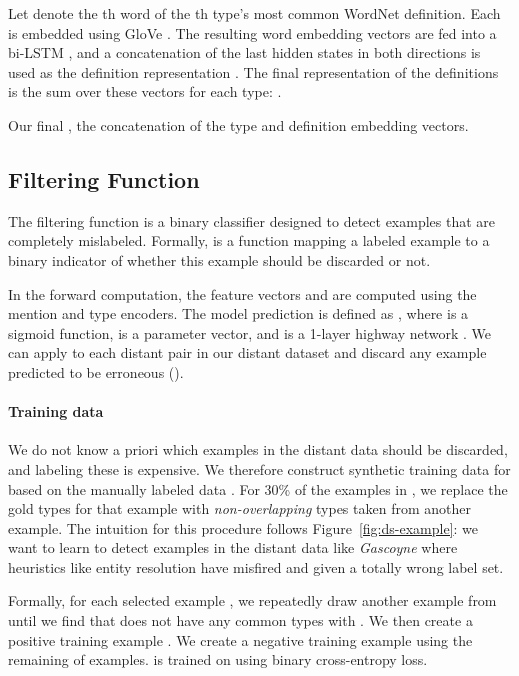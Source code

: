 \documentclass[11pt,a4paper]{article}
\begin{document}
Let  denote the th word of the th type's most common WordNet definition. Each  is embedded using GloVe \cite{glove_14}. The resulting word embedding vectors  are fed into a bi-LSTM \cite{lstm, bilstm}, and a concatenation of the last hidden states in both directions is used as the definition representation . The final representation of the definitions is the sum over these vectors for each type: .  

Our final , the concatenation of the type and definition embedding vectors.



\vspace{6pt}
 

\subsection{Filtering Function}\label{filter}

The filtering function  is a binary classifier designed to detect examples that are completely mislabeled. Formally,  is a function mapping a labeled example  to a binary indicator  of whether this example should be discarded or not.

In the forward computation, the feature vectors  and  are computed using the mention and type encoders. The model prediction is defined as , where  is a sigmoid function,  is a parameter vector, and  is a 1-layer highway network \cite{highway15}. We can apply  to each distant pair in our distant dataset  and discard any example predicted to be erroneous ().

\vspace{-4pt}
\paragraph{Training data} We do not know a priori which examples in the distant data should be discarded, and labeling these is expensive. We therefore construct synthetic training data  for  based on the manually labeled data . For 30\% of the examples in , we replace the gold types for that example with \emph{non-overlapping} types taken from another example. The intuition for this procedure follows Figure~\ref{fig:ds-example}: we want to learn to detect examples in the distant data like \emph{Gascoyne} where heuristics like entity resolution have misfired and given a totally wrong label set.

Formally, for each selected example , we repeatedly draw another example  from  until we find  that does not have any common types with . We then create a positive training example . We create a negative training example  using the remaining  of examples.  is trained on  using binary cross-entropy loss. 
\end{document}
